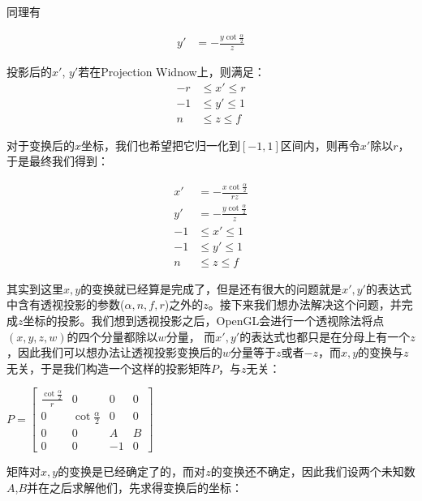 \documentclass[UTF8]{ctexart}
\begin{document}
同理有

\begin{align}
y' &= -\frac{y\cot\frac{\alpha}{2}}{z}
\end{align}

投影后的$x'$, $y'$若在Projection Widnow上，则满足：
\begin{align}
 -r& \le x' \le r \\
 -1&\le y' \le 1 \\
 n & \le z \le f 
\end{align}

对于变换后的$x$坐标，我们也希望把它归一化到$[-1,1]$区间内，则再令$x'$除以$r$，于是最终我们得到：

\begin{align}
    x' &= -\frac{x\cot\frac{\alpha}{2}}{rz} \\
    y' &= -\frac{y\cot\frac{\alpha}{2}}{z} \\
    -1& \le x' \le 1 \\
    -1&\le y' \le 1 \\
    n & \le z \le f 
\end{align}

\newpage

其实到这里$x,y$的变换就已经算是完成了，但是还有很大的问题就是$x', y'$的表达式中含有透视投影的参数($\alpha,n,f,r$)之外的$z$。接下来我们想办法解决这个问题，并完成$z$坐标的投影。我们想到透视投影之后，OpenGL会进行一个透视除法将点$(x,y,z,w)$的四个分量都除以$w$分量，
而$x', y'$的表达式也都只是在分母上有一个$z$，因此我们可以想办法让透视投影变换后的$w$分量等于$z$或者$-z$，而$x, y$的变换与$z$无关，于是我们构造一个这样的投影矩阵$P$，与$z$无关：

\vspace{1em}

$ P = \begin{bmatrix} \frac{\cot\frac{\alpha}{2}}{r} & 0 & 0 & 0 \\
                      0 & \cot\frac{\alpha}{2} & 0 & 0 \\
                      0 & 0 & A & B \\
                      0 & 0 & -1 & 0 
    \end {bmatrix}$


矩阵对$x, y$的变换是已经确定了的，而对$z$的变换还不确定，因此我们设两个未知数$A$,$B$并在之后求解他们，先求得变换后的坐标：

\vspace{1em}
\end{document}
